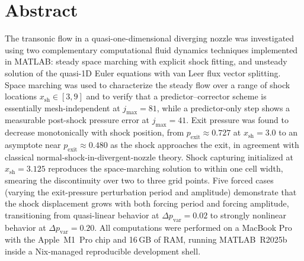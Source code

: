 
\pagebreak

\thispagestyle{empty}
\hypertarget{tableofcontents}{\tableofcontents}

\renewcommand{\listfigurename}{Figures}
\listoffigures

\renewcommand{\listtablename}{Tables}
\listoftables

\renewcommand{\listlistingname}{Listings}
\listoflistings

\newpage
{}


\section{Abstract} \label{sec:abstract}

The transonic flow in a quasi-one-dimensional diverging nozzle was investigated using two complementary computational fluid dynamics techniques implemented in MATLAB: steady space marching with explicit shock fitting, and unsteady solution of the quasi-1D Euler equations with van Leer flux vector splitting. Space marching was used to characterize the steady flow over a range of shock locations \(x_\text{sh} \in [3, 9]\) and to verify that a predictor--corrector scheme is essentially mesh-independent at \(j_\text{max} = 81\), while a predictor-only step shows a measurable post-shock pressure error at \(j_\text{max} = 41\). Exit pressure was found to decrease monotonically with shock position, from \(p_\text{exit} \approx 0.727\) at \(x_\text{sh} = 3.0\) to an asymptote near \(p_\text{exit} \approx 0.480\) as the shock approaches the exit, in agreement with classical normal-shock-in-divergent-nozzle theory. Shock capturing initialized at \(x_\text{sh} = 3.125\) reproduces the space-marching solution to within one cell width, smearing the discontinuity over two to three grid points. Five forced cases (varying the exit-pressure perturbation period and amplitude) demonstrate that the shock displacement grows with both forcing period and forcing amplitude, transitioning from quasi-linear behavior at \(\Delta p_\text{var} = 0.02\) to strongly nonlinear behavior at \(\Delta p_\text{var} = 0.20\). All computations were performed on a MacBook Pro with the Apple~M1~Pro chip and 16\,GB of RAM, running MATLAB~R2025b inside a Nix-managed reproducible development shell.

